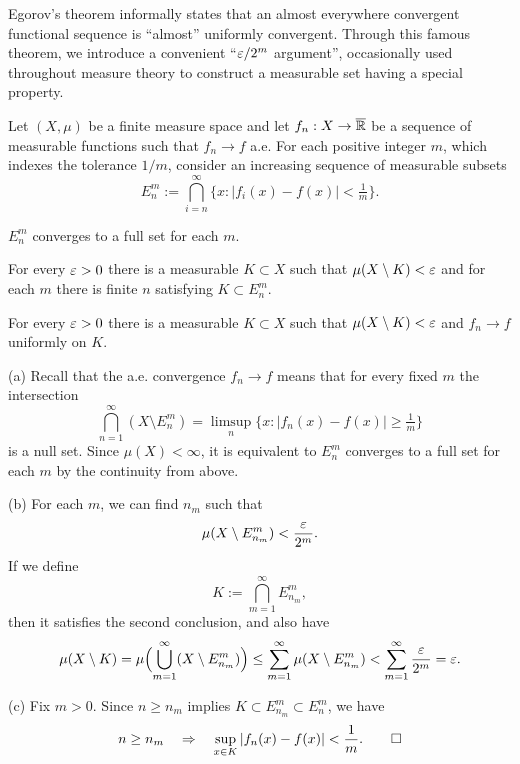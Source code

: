 \documentclass{../../large}
\begin{document}
\begin{prb}
Egorov's theorem informally states that an almost everywhere convergent functional sequence is ``almost'' uniformly convergent.
Through this famous theorem, we introduce a convenient ``$\varepsilon/2^m$ argument'', occasionally used throughout measure theory to construct a measurable set having a special property.

Let $(X,\mu)$ be a finite measure space and let $f_n:X\to\overline{\mathbb{R}}$ be a sequence of measurable functions such that $f_n\to f$ a.e.
For each positive integer $m$, which indexes the tolerance $1/m$, consider an increasing sequence of measurable subsets
\[E_n^m:=\bigcap_{i=n}^\infty\{x:|f_i(x)-f(x)|<\tfrac1m\}.\]
\begin{parts}
\item $E_n^m$ converges to a full set for each $m$.
\item For every $\varepsilon>0$ there is a measurable $K\subset X$ such that $\mu(X\setminus K)<\varepsilon$ and for each $m$ there is finite $n$ satisfying $K\subset E_n^m$.
\item For every $\varepsilon>0$ there is a measurable $K\subset X$ such that $\mu(X\setminus K)<\varepsilon$ and $f_n\to f$ uniformly on $K$.
\end{parts}
\end{prb}
\begin{pf}
(a)
Recall that the a.e. convergence $f_n\to f$ means that for every fixed $m$ the intersection
\[\bigcap_{n=1}^\infty(X\setminus E_n^m)=\limsup_n\{x:|f_n(x)-f(x)|\ge\tfrac1m\}\]
is a null set.
Since $\mu(X)<\infty$, it is equivalent to $E_n^m$ converges to a full set for each $m$ by the continuity from above.

(b)
For each $m$, we can find $n_m$ such that
\[\mu(X\setminus E_{n_m}^m)<\frac{\varepsilon}{2^m}.\]
If we define
\[K:=\bigcap_{m=1}^\infty E_{n_m}^m,\]
then it satisfies the second conclusion, and also have
\[\mu(X\setminus K)=\mu\Bigl(\bigcup_{m=1}^\infty(X\setminus E_{n_m}^m)\Bigr)\le\sum_{m=1}^\infty\mu(X\setminus E_{n_m}^m)<\sum_{m=1}^\infty\frac{\varepsilon}{2^m}=\varepsilon.\]


(c)
Fix $m>0$.
Since $n\ge n_m$ implies $K\subset E_{n_m}^m\subset E_n^m$, we have
\[n\ge n_m\quad\Rightarrow\quad\sup_{x\in K}|f_n(x)-f(x)|<\frac1m.\qedhere\]
\end{pf}
\end{document}
